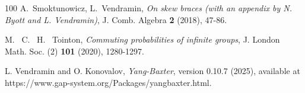 \documentclass[oneside]{amsart}
\numberwithin{equation}{section}
\theoremstyle{plain}
\theoremstyle{definition}
\begin{document}
\begin{thebibliography}{100}
A.~Smoktunowicz, L.~Vendramin, \emph{On skew braces (with an appendix by N. Byott and L. Vendramin)}, J. Comb. Algebra {\bf 2} (2018), 47-86.



M.~ C.~ H.~ Tointon, \emph{Commuting probabilities of  infinite groups},  J. London Math. Soc. (2) {\bf 101} (2020), 1280-1297. 


L. Vendramin and  O. Konovalov, {\it Yang-Baxter}, version 0.10.7  (2025), available at https://www.gap-system.org/Packages/yangbaxter.html.



\end{thebibliography}
\end{document}
